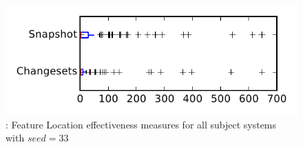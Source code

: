 
\begin{figure}
\centering
\includegraphics[height=0.4\textheight]{figures/flt_seed/rq1_tiny_33}
\caption{\rone: Feature Location effectiveness measures for all subject systems with $seed=33$}
\label{fig:flt_seed:rq1:tiny}
\end{figure}
